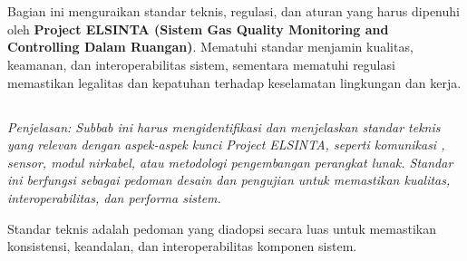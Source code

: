 \documentclass{elsinta}
\begin{document}
\section{\StandardsComplianceTitle}

Bagian ini menguraikan standar teknis, regulasi, dan aturan yang harus dipenuhi oleh \textbf{Project ELSINTA (Sistem Gas Quality Monitoring and Controlling Dalam Ruangan)}. Mematuhi standar menjamin kualitas, keamanan, dan interoperabilitas sistem, sementara mematuhi regulasi memastikan legalitas dan kepatuhan terhadap keselamatan lingkungan dan kerja.

\subsection{\TechnicalStandardsTitle}
\textit{Penjelasan: Subbab ini harus mengidentifikasi dan menjelaskan standar teknis yang relevan dengan aspek-aspek kunci Project ELSINTA, seperti komunikasi , sensor, modul nirkabel, atau metodologi pengembangan perangkat lunak. Standar ini berfungsi sebagai pedoman desain dan pengujian untuk memastikan kualitas, interoperabilitas, dan performa sistem.}

Standar teknis adalah pedoman yang diadopsi secara luas untuk memastikan konsistensi, keandalan, dan interoperabilitas komponen sistem.
\end{document}
